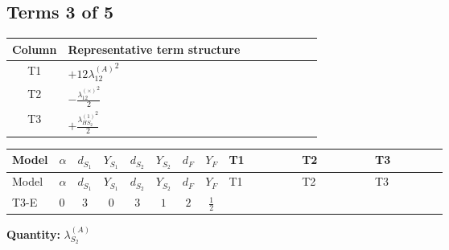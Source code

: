 \documentclass[8pt]{article}
\begin{document}
\begin{landscape}
\subsection*{Terms 3 of 5}
\begin{center}
\begin{tabular}{@{}c >{\raggedright\arraybackslash}p{0.82\linewidth}@{}}
\toprule
Column & Representative term structure \\
\midrule
T1 & \(\displaystyle +12 {\lambda_{12}^{(A)}}^2\) \\
\midrule
T2 & \(\displaystyle -\frac{{\lambda_{12}^{(\times)}}^2}{2}\) \\
\midrule
T3 & \(\displaystyle +\frac{{\lambda_{HS_2}^{(1)}}^2}{2}\) \\
\midrule
\bottomrule
\end{tabular}
\end{center}
\smallskip
\tiny
\begin{longtable}{@{}llcccccc >{\raggedright\arraybackslash}p{0.21\linewidth} >{\raggedright\arraybackslash}p{0.21\linewidth} >{\raggedright\arraybackslash}p{0.21\linewidth}@{}}
\toprule
Model & $\alpha$ & $d_{S_1}$ & $Y_{S_1}$ & $d_{S_2}$ & $Y_{S_2}$ & $d_F$ & $Y_F$ & T1 & T2 & T3 \\
\midrule
\endfirsthead
\toprule
Model & $\alpha$ & $d_{S_1}$ & $Y_{S_1}$ & $d_{S_2}$ & $Y_{S_2}$ & $d_F$ & $Y_F$ & T1 & T2 & T3 \\
\midrule
\endhead
T3-E & $0$ & $3$ & $0$ & $3$ & $1$ & $2$ & $\frac{1}{2}$ & \scriptsize\adjustbox{max width=\linewidth}{$\begin{gathered} +12 {\lambda_{12}^{(A)}}^2\end{gathered}$} & \scriptsize\adjustbox{max width=\linewidth}{$\begin{gathered} -\frac{{\lambda_{12}^{(\times)}}^2}{2}\end{gathered}$} & \scriptsize\adjustbox{max width=\linewidth}{$\begin{gathered} +\frac{{\lambda_{HS_2}^{(1)}}^2}{2}\end{gathered}$} \\
\midrule
\bottomrule
\end{longtable}
\clearpage
\noindent\textbf{Quantity: }$\lambda_{S_2}^{(A)}$\par\smallskip

\end{landscape}
\end{document}
